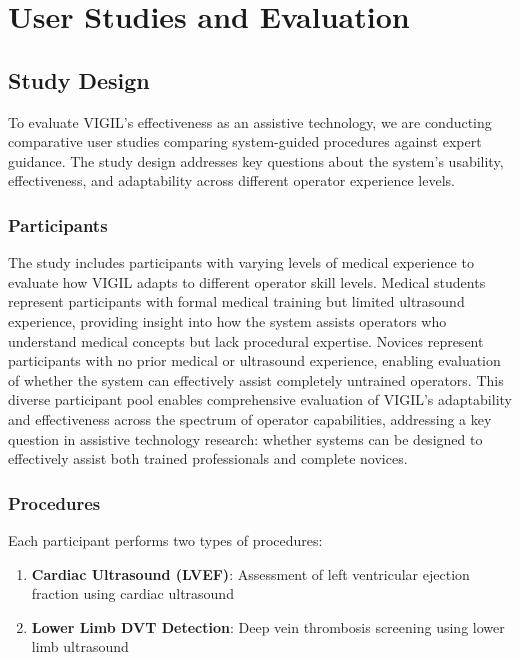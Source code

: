 \documentclass[12pt,a4paper]{article}
\begin{document}
\section{User Studies and Evaluation}

\subsection{Study Design}

To evaluate VIGIL's effectiveness as an assistive technology, we are conducting comparative user studies comparing system-guided procedures against expert guidance. The study design addresses key questions about the system's usability, effectiveness, and adaptability across different operator experience levels.

\subsubsection{Participants}

The study includes participants with varying levels of medical experience to evaluate how VIGIL adapts to different operator skill levels. Medical students represent participants with formal medical training but limited ultrasound experience, providing insight into how the system assists operators who understand medical concepts but lack procedural expertise. Novices represent participants with no prior medical or ultrasound experience, enabling evaluation of whether the system can effectively assist completely untrained operators. This diverse participant pool enables comprehensive evaluation of VIGIL's adaptability and effectiveness across the spectrum of operator capabilities, addressing a key question in assistive technology research: whether systems can be designed to effectively assist both trained professionals and complete novices.

\subsubsection{Procedures}

Each participant performs two types of procedures:

\begin{enumerate}
    \item \textbf{Cardiac Ultrasound (LVEF)}: Assessment of left ventricular ejection fraction using cardiac ultrasound
    \item \textbf{Lower Limb DVT Detection}: Deep vein thrombosis screening using lower limb ultrasound
\end{enumerate}
\end{document}
